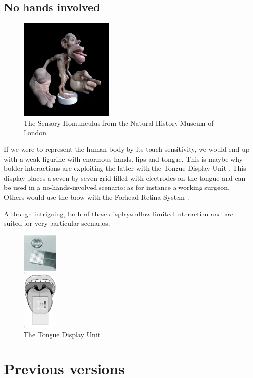 \subsection{No hands involved}\label{no-hands-involved}


\begin{figure}[!ht]
	\centering
	\includegraphics[height=5cm]{figures/sensory_homunculus.png}
	\caption{The Sensory Homunculus from the Natural History Museum of London \cite{homonculus}}
\end{figure}

If we were to represent the human body by its touch sensitivity, we would
end up with a weak figurine with enormous hands, lips and tongue. This
is maybe why bolder interactions are exploiting the latter with the
Tongue Display Unit \cite{bach1998form}. This display places a seven by seven grid
filled with electrodes on the tongue and can be used in a
no-hands-involved scenario: as for instance a working surgeon. Others
would use the brow with the Forhead Retina System \cite{kajimoto2006forehead}.

Although intriguing, both of these displays allow limited interaction
and are suited for very particular scenarios.

\begin{figure}[!ht]
	\centering
	\includegraphics[height=5cm]{figures/tongue_display_unit.png}
	\caption{The Tongue Display Unit}
\end{figure}

\section{Previous versions}\label{previous-versions}

